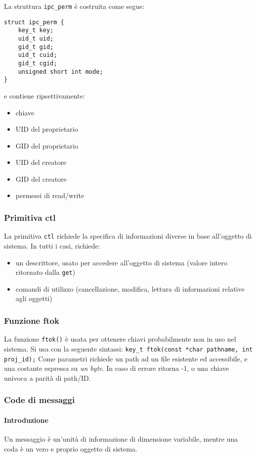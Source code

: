 \documentclass[a4paper]{article}
\begin{document}
La struttura \verb|ipc_perm| è costruita come segue:
\begin{verbatim}
struct ipc_perm {
    key_t key;
    uid_t uid;
    gid_t gid;
    uid_t cuid;
    gid_t cgid;
    unsigned short int mode;
}
\end{verbatim}
e contiene ripsettivamente:
\begin{itemize}
\item chiave
\item UID del proprietario
\item GID del proprietario
\item UID del creatore
\item GID del creatore
\item permessi di read/write
\end{itemize}

\subsubsection{Primitiva ctl}
La primitiva \verb|ctl| richiede la specifica di informazioni diverse in base all'oggetto di sistema.
In tutti i casi, richiede:
\begin{itemize}
\item un descrittore, usato per accedere all'oggetto di sistema (valore intero ritornato dalla \verb|get|)
\item comandi di utilizzo (cancellazione, modifica, lettura di informazioni relative agli oggetti)
\end{itemize}

\subsubsection{Funzione ftok}
La funzione \verb|ftok()| è usata per ottenere chiavi probabilmente non in uso nel sistema.
Si usa con la seguente sintassi:
\verb|key_t ftok(const *char pathname, int proj_id);|
Come parametri richiede un path ad un file esistente ed accessibile, e una costante espressa su \textit{un byte}.
In caso di errore ritorna -1, o una chiave univoca a parità di path/ID.

\subsubsection{Code di messaggi}
\paragraph{Introduzione}
Un messaggio è un'unità di informazione di dimensione variabile, mentre una coda è un vero e proprio oggetto di sistema. 
\end{document}
